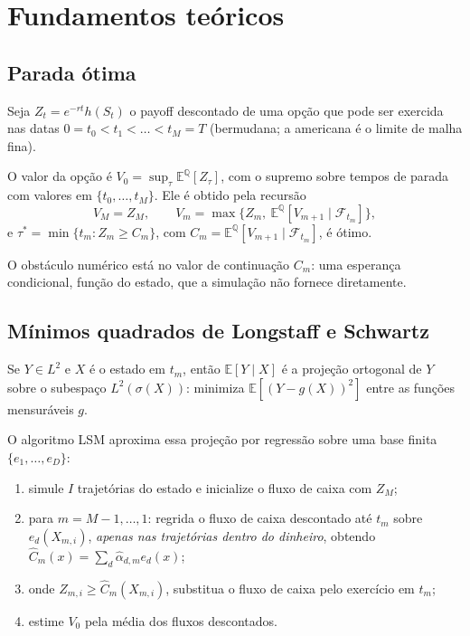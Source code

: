 \section{Fundamentos teóricos}

\subsection{Parada ótima}

Seja $Z_t=e^{-rt}h(S_t)$ o payoff descontado de uma opção que pode ser exercida nas datas $0=t_0<t_1<\dots<t_M=T$ (bermudana; a americana é o limite de malha fina).

\begin{teorema}\label{teo:pd}
O valor da opção é $V_0=\sup_{\tau}\mathbb E^{\mathbb Q}[Z_\tau]$, com o supremo sobre tempos de parada com valores em $\{t_0,\dots,t_M\}$. Ele é obtido pela recursão
\begin{equation}\label{eq:pd}
V_M=Z_M,\qquad V_m=\max\big\{Z_m,\ \mathbb E^{\mathbb Q}[V_{m+1}\mid\mathcal F_{t_m}]\big\},
\end{equation}
e $\tau^*=\min\{t_m:Z_m\ge C_m\}$, com $C_m=\mathbb E^{\mathbb Q}[V_{m+1}\mid\mathcal F_{t_m}]$, é ótimo.
\end{teorema}

O obstáculo numérico está no valor de continuação $C_m$: uma esperança condicional, função do estado, que a simulação não fornece diretamente.

\subsection{Mínimos quadrados de Longstaff e Schwartz}

\begin{proposicao}
Se $Y\in L^2$ e $X$ é o estado em $t_m$, então $\mathbb E[Y\mid X]$ é a projeção ortogonal de $Y$ sobre o subespaço $L^2(\sigma(X))$: minimiza $\mathbb E[(Y-g(X))^2]$ entre as funções mensuráveis $g$.
\end{proposicao}

O algoritmo LSM \citep{longstaffschwartz2001} aproxima essa projeção por regressão sobre uma base finita $\{e_1,\dots,e_D\}$:
\begin{enumerate}
\item simule $I$ trajetórias do estado e inicialize o fluxo de caixa com $Z_M$;
\item para $m=M-1,\dots,1$: regrida o fluxo de caixa descontado até $t_m$ sobre $e_d(X_{m,i})$, \emph{apenas nas trajetórias dentro do dinheiro}, obtendo $\hat C_m(x)=\sum_d\hat\alpha_{d,m}e_d(x)$;
\item onde $Z_{m,i}\ge\hat C_m(X_{m,i})$, substitua o fluxo de caixa pelo exercício em $t_m$;
\item estime $V_0$ pela média dos fluxos descontados.
\end{enumerate}

